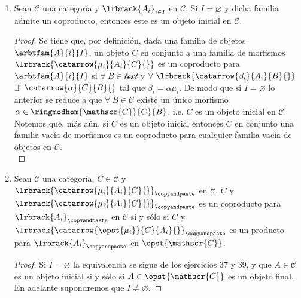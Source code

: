 \documentclass{article}
\begin{document}
\begin{enumerate}[label=\textbf{Ej \arabic*.}]
\begin{proof}
Ahora, sea $Q\in Sets$ y $\{\alpha_i:Q\to A_i\}_{i\in I}$ en $Sets$, por lo anterior existe una única $\varphi:Q\to P$ y es tal que $\forall i\in I$
$\pi_i\alpha=\alpha_i$ (Como $I$ es vacio esta propiedad se cumple por vacuidad). Así $P$ con la familia $\{\pi_i:P\to A_i\}_{i\in I}$ es un 
producto en $Sets$.\\

Ahora, el producto cartesiano de $\displaystyle\prod_{i\in I}X_i=\{g:I\to \bigcup_{i\in I} X_i\,|\,\forall i\in I\quad g(i)\in X_i\}$, si $I$ es vacio, la única
$g:I\to \bigcup_{i\in I} X_i$ es la función vacia $f_\emptyset$, por lo que $\displaystyle\prod_{i\in I}X_i=\{f_\emptyset:\emptyset\to \emptyset\}=
\{\emptyset\}$, el cual es un conjunto con un único elemento.

\end{proof}

		\item Sean $\mathscr{C}$ una categoría y $\lrbrack{A_i}_{i\in I}$ en $\mathscr{C}$. Si $I=\varnothing$ y dicha familia admite un coproducto, entonces este es un objeto inicial en $\mathscr{C}$.
		\begin{proof}
			Se tiene que, por definición, dada una familia de objetos $\arbtfam{A}{i}{I}$, un objeto $C$ en conjunto a una familia de morfismos $\lrbrack{\catarrow{\mu_i}{A_i}{C}{}}$ es un coproducto para $\arbtfam{A}{i}{I}$ si $\forall\ B\in\mathscr{text}$ y $\forall\ \lrbrack{\catarrow{\beta_i}{A_i}{B}{}}$ $\exists !$ $\catarrow{\alpha}{C}{B}{}$ tal que $\beta_i=\alpha\mu_i$. De modo que si $I=\varnothing$ lo anterior se reduce a que $\forall\ B\in\mathscr{C}$ existe un único morfismo $\alpha\in\ringmodhom{\mathscr{C}}{C}{B}$, i.e. $C$ es un objeto inicial en $\mathscr{C}$.\\
			Notemos que, más aún, si $C$ es un objeto inicial entonces $C$ en conjunto una familia vacía de morfismos es un coproducto para cualquier familia vacía de objetos en $\mathscr{C}$.\\
		\end{proof}
		\item  Sean $\mathscr{C}$ una categoría, $C\in\mathscr{C}$ y $\lrbrack{\catarrow{\mu_i}{A_i}{C}{}}_{\copyandpaste}$ en $\mathscr{C}$.  $C$ y $\lrbrack{\catarrow{\mu_i}{A_i}{C}{}}_{\copyandpaste}$ es un coproducto para $\lrbrack{A_i}_{\copyandpaste}$ en $\mathscr{C}$ si y sólo si $C$ y $\lrbrack{\catarrow{\opst{\mu_i}}{C}{A_i}{}}_{\copyandpaste}$ es un producto para $\lrbrack{A_i}_{\copyandpaste}$ en $\opst{\mathscr{C}}$.
		\begin{proof}
			Si $I=\varnothing$ la equivalencia se sigue de los ejercicios 37 y 39, y que $A\in\mathscr{C}$ es un objeto inicial si y sólo si $A\in\opst{\mathscr{C}}$ es un objeto final. En adelante supondremos que $I\neq\varnothing$.
						

\end{proof}
\end{enumerate}
\end{document}

